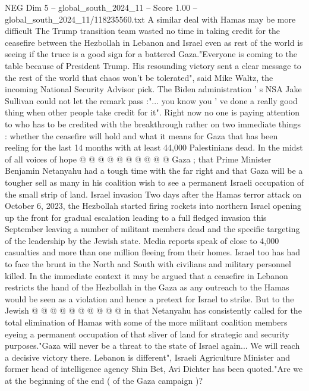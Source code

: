 \begin{textsample}{NEG Dim 5 – global\_south\_2024\_11 – Score 1.00 – global\_south\_2024\_11/118235560.txt}  \label{ex:f5_neg_435}
A similar deal with Hamas may be more difficult The Trump transition team wasted no time in taking credit for the ceasefire between the Hezbollah in Lebanon and Israel even as rest of the world is seeing if the truce is a good sign for a battered Gaza."Everyone is coming to the table because of President Trump.
His resounding victory sent a clear message to the rest of the world that chaos won't be tolerated", said Mike Waltz, the incoming National Security Advisor pick.
The Biden administration ' s NSA Jake Sullivan could not let the remark pass :"... you know you ' ve done a really good thing when other people take credit for it".
Right now no one is paying attention to who has to be credited with the breakthrough rather on two immediate things : whether the ceasefire will hold and what it means for Gaza that has been reeling for the last 14 months with at least 44,000 Palestinians dead.
In the midst of all voices of hope @ @ @ @ @ @ @ @ @ @ Gaza ; that Prime Minister Benjamin Netanyahu had a tough time with the far right and that Gaza will be a tougher sell as many in his coalition wish to see a permanent Israeli occupation of the small strip of land.
Israel invasion Two days after the Hamas terror attack on October 6, 2023, the Hezbollah started firing rockets into northern Israel opening up the front for gradual escalation leading to a full fledged invasion this September leaving a number of militant members dead and the specific targeting of the leadership by the Jewish state.
Media reports speak of close to 4,000 casualties and more than one million fleeing from their homes.
Israel too has had to face the brunt in the North and South with civilians and military personnel killed.
In the immediate context it may be argued that a ceasefire in Lebanon restricts the hand of the Hezbollah in the Gaza as any outreach to the Hamas would be seen as a violation and hence a pretext for Israel to strike.
But to the Jewish @ @ @ @ @ @ @ @ @ @ in that Netanyahu has consistently called for the total elimination of Hamas with some of the more militant coalition members eyeing a permanent occupation of that sliver of land for strategic and security purposes."Gaza will never be a threat to the state of Israel again...
We will reach a decisive victory there.
Lebanon is different", Israeli Agriculture Minister and former head of intelligence agency Shin Bet, Avi Dichter has been quoted."Are we at the beginning of the end ( of the Gaza campaign )?

\end{textsample}
